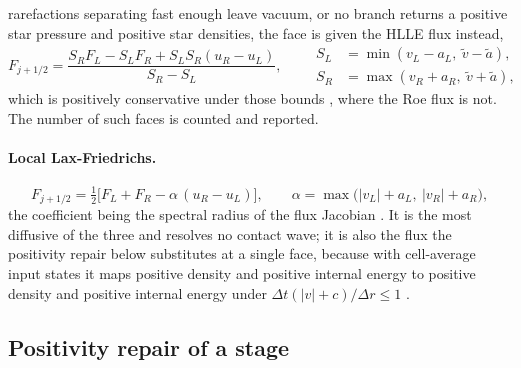 rarefactions separating fast enough leave vacuum, or no branch returns a
positive star pressure and positive star densities, the face is given the
HLLE flux instead,
%
\begin{equation}
  F_{j+1/2} = \frac{S_R F_L - S_L F_R + S_L S_R (u_R - u_L)}{S_R - S_L},
  \qquad
  \begin{aligned}
    S_L &= \min(v_L - a_L,\ \tilde v - \tilde a),\\
    S_R &= \max(v_R + a_R,\ \tilde v + \tilde a),
  \end{aligned}
  \label{eq:hlle}
\end{equation}
%
which is positively conservative under those bounds \citep{Einfeldt1991},
where the Roe flux is not.  The number of such faces is counted and reported.

\paragraph{Local Lax-Friedrichs.}
%
\begin{equation}
  F_{j+1/2} = \tfrac12\bigl[F_L + F_R - \alpha\,(u_R - u_L)\bigr],
  \qquad
  \alpha = \max\bigl(|v_L| + a_L,\ |v_R| + a_R\bigr),
  \label{eq:llf}
\end{equation}
%
the coefficient being the spectral radius of the flux Jacobian
\citep{Rusanov1961}.  It is the most diffusive of the three and resolves no
contact wave; it is also the flux the positivity repair below substitutes at
a single face, because with cell-average input states it maps positive
density and positive internal energy to positive density and positive
internal energy under $\Delta t(|v|+c)/\Delta r \le 1$
\citep{Perthame1996, Zhang2010b}.

\subsection{Positivity repair of a stage}
\label{sec:numerics:posflux}


